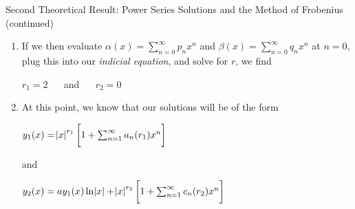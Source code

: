 \documentclass{beamer}
\begin{document}
\begin{frame}{Second Theoretical Result: Power Series Solutions and the Method of Frobenius (continued)}

\begin{enumerate}

\suite

\item If we then evaluate $\alpha(x)=\sum_{n=0}^{\infty} p_{n} x^{n}$ and $\beta(x)=\sum_{n=0}^{\infty} q_{n} x^{n}$ at $n=0$, plug this into our \textit{indicial equation}, and solve for $r$, we find

\begin{center}

\begin{minipage}{4cm}

\begin{varblock}[4cm]

$r_{1}=2$ $\quad$ and $\quad$ $r_{2}=0$

\end{varblock}

\end{minipage}

\end{center}

\item At this point, we know that our solutions will be of the form

\begin{center}

\begin{minipage}{6cm}

\begin{varblock}[6cm]

$y_{1}(x)=\abs{x}^{r_{1}} \bigg[1 + \sum_{n=1}^{\infty} a_{n}(r_{1})x^n\bigg]$

\end{varblock}

\end{minipage}

\end{center}

and

\begin{center}

\begin{minipage}{8cm}

\begin{varblock}[8cm]

$y_{2}(x)=ay_{1}(x) \ln{\abs{x}} + \abs{x}^{r_{2}} \bigg[1 + \sum_{n=1}^{\infty} c_{n}(r_{2})x^n\bigg]$

\end{varblock}

\end{minipage}

\end{center}

\asuivre

\end{enumerate}

\end{frame}
\end{document}
